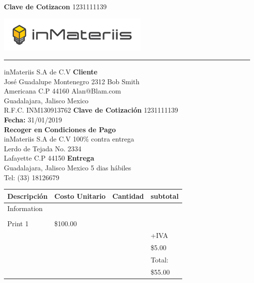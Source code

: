 \documentclass[12pt]{report}
\begin{document}
\begin{flushright} \textbf{Clave de Cotizacon} 1231111139\end{flushright}
\includegraphics[width=20em]{inmats.jpg}
\hrule
\vspace{1cm}
 
{\noindent
inMateriis S.A de C.V \hfill \textbf{Cliente} \hspace{10em} \\
Jos\'e Guadalupe Montenegro 2312 \hfill Bob Smith\hspace{8.5em} \\
Americana C.P 44160 \hfill Alan@Blam.com\hspace{8em} \\
Guadalajara, Jalisco Mexico \\
 
\noindent
R.F.C. INM130913762 \hfill \textbf{Clave de Cotizaci\'on} 1231111139 \\
\textbf{Fecha:} 31/01/2019 \\
 
\noindent
\textbf{Recoger en}  \hfill \textbf{Condiciones de Pago} \hspace{4em} \\
inMateriis S.A de C.V  \hfill 100\% contra entrega \hspace{5.5em} \\
Lerdo de Tejada No. 2334 \\
Lafayette C.P 44150  \hfill \textbf{Entrega} \hspace{10.5em} \\
Guadalajara, Jalisco Mexico   \hfill 5 dias h\'abiles \hspace{8.5em} \\
Tel: (33) 18126679\\
\begin{center}
\begin{large}
\begin{tabular}{| >{\centering\arraybackslash}m{3cm} | >{\centering\arraybackslash}m{4cm} | >{\centering\arraybackslash}m{2cm} |  >{\centering\arraybackslash}m{4cm}|} 
\hline
Descripci\'on & Costo Unitario & Cantidad & subtotal \\
\hline
Information & & &\\
& & &\\ 
Print 1 & \$100.00 &1 &  \\& & & +IVA \\ 
& & & \$5.00\\ 
& & & Total: \\ 
& & & \$55.00\\ 
 \hline
 \end{tabular}
 \end{large}
 

\end{center}}
\end{document}

